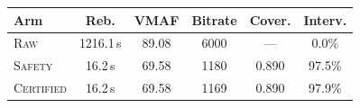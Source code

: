 \begin{tabular}{@{}lccccc@{}}
\toprule
\textbf{Arm} & \textbf{Reb.} & \textbf{VMAF} & \textbf{Bitrate} & \textbf{Cover.} & \textbf{Interv.} \\
\midrule
\textsc{Raw} & 1216.1\,s & 89.08 & 6000 & --- & 0.0\% \\
\textsc{Safety} & 16.2\,s & 69.58 & 1180 & 0.890 & 97.5\% \\
\textsc{Certified} & 16.2\,s & 69.58 & 1169 & 0.890 & 97.9\% \\
\bottomrule
\end{tabular}
